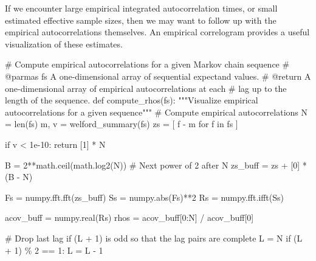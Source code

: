 \documentclass[
  letterpaper,
  DIV=11,
  numbers=noendperiod]{scrartcl}
\newenvironment{Shaded}{\begin{snugshade}}{\end{snugshade}}
\newcommand{\BuiltInTok}[1]{\textcolor[rgb]{0.00,0.23,0.31}{#1}}
\newcommand{\CommentTok}[1]{\textcolor[rgb]{0.37,0.37,0.37}{#1}}
\newcommand{\ControlFlowTok}[1]{\textcolor[rgb]{0.00,0.23,0.31}{#1}}
\newcommand{\DecValTok}[1]{\textcolor[rgb]{0.68,0.00,0.00}{#1}}
\newcommand{\FloatTok}[1]{\textcolor[rgb]{0.68,0.00,0.00}{#1}}
\newcommand{\KeywordTok}[1]{\textcolor[rgb]{0.00,0.23,0.31}{#1}}
\newcommand{\NormalTok}[1]{\textcolor[rgb]{0.00,0.23,0.31}{#1}}
\newcommand{\OperatorTok}[1]{\textcolor[rgb]{0.37,0.37,0.37}{#1}}
\begin{document}
If we encounter large empirical integrated autocorrelation times, or
small estimated effective sample sizes, then we may want to follow up
with the empirical autocorrelations themselves. An empirical correlogram
provides a useful visualization of these estimates.

\begin{Shaded}
\begin{Highlighting}[]

\CommentTok{\# Compute empirical autocorrelations for a given Markov chain sequence}
\CommentTok{\# @parmas fs A one{-}dimensional array of sequential expectand values.}
\CommentTok{\# @return A one{-}dimensional array of empirical autocorrelations at each }
\CommentTok{\#         lag up to the length of the sequence.}
\KeywordTok{def}\NormalTok{ compute\_rhos(fs):}
  \CommentTok{"""Visualize empirical autocorrelations for a given sequence"""}
  \CommentTok{\# Compute empirical autocorrelations}
\NormalTok{  N }\OperatorTok{=} \BuiltInTok{len}\NormalTok{(fs)}
\NormalTok{  m, v }\OperatorTok{=}\NormalTok{ welford\_summary(fs)}
\NormalTok{  zs }\OperatorTok{=}\NormalTok{ [ f }\OperatorTok{{-}}\NormalTok{ m }\ControlFlowTok{for}\NormalTok{ f }\KeywordTok{in}\NormalTok{ fs ]}
  
  \ControlFlowTok{if}\NormalTok{ v }\OperatorTok{\textless{}} \FloatTok{1e{-}10}\NormalTok{:}
    \ControlFlowTok{return}\NormalTok{ [}\DecValTok{1}\NormalTok{] }\OperatorTok{*}\NormalTok{ N}
  
\NormalTok{  B }\OperatorTok{=} \DecValTok{2}\OperatorTok{**}\NormalTok{math.ceil(math.log2(N)) }\CommentTok{\# Next power of 2 after N}
\NormalTok{  zs\_buff }\OperatorTok{=}\NormalTok{ zs }\OperatorTok{+}\NormalTok{ [}\DecValTok{0}\NormalTok{] }\OperatorTok{*}\NormalTok{ (B }\OperatorTok{{-}}\NormalTok{ N)}
  
\NormalTok{  Fs }\OperatorTok{=}\NormalTok{ numpy.fft.fft(zs\_buff)}
\NormalTok{  Ss }\OperatorTok{=}\NormalTok{ numpy.}\BuiltInTok{abs}\NormalTok{(Fs)}\OperatorTok{**}\DecValTok{2}
\NormalTok{  Rs }\OperatorTok{=}\NormalTok{ numpy.fft.ifft(Ss)}
  
\NormalTok{  acov\_buff }\OperatorTok{=}\NormalTok{ numpy.real(Rs)}
\NormalTok{  rhos }\OperatorTok{=}\NormalTok{ acov\_buff[}\DecValTok{0}\NormalTok{:N] }\OperatorTok{/}\NormalTok{ acov\_buff[}\DecValTok{0}\NormalTok{]}
  
  \CommentTok{\# Drop last lag if (L + 1) is odd so that the lag pairs are complete}
\NormalTok{  L }\OperatorTok{=}\NormalTok{ N}
  \ControlFlowTok{if}\NormalTok{ (L }\OperatorTok{+} \DecValTok{1}\NormalTok{) }\OperatorTok{\%} \DecValTok{2} \OperatorTok{==} \DecValTok{1}\NormalTok{:}
\NormalTok{    L }\OperatorTok{=}\NormalTok{ L }\OperatorTok{{-}} \DecValTok{1}
  

\end{Highlighting}
\end{Shaded}
\end{document}
